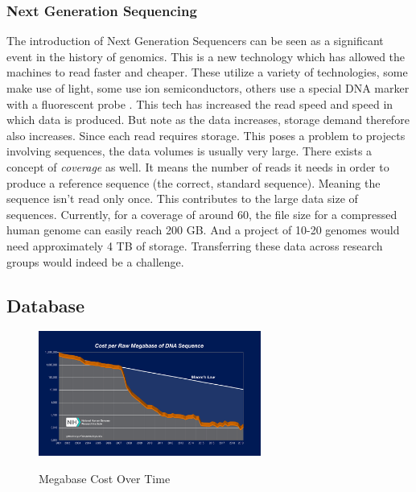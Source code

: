 \documentclass{article}
\begin{document}
\subsubsection{Next Generation Sequencing}


The introduction of Next Generation Sequencers can be seen as a significant event in the history of genomics. This is a new technology which has allowed the machines to read faster and cheaper. These utilize a variety of technologies, some make use of light, some use ion semiconductors, others use a special DNA marker with a fluorescent probe \autocite[~p.67]{paulselzer2018}. This tech has increased the read speed and speed in which data is produced. But note as the data increases, storage demand therefore also increases. Since each read requires storage. This poses a problem to projects involving sequences, the data volumes is usually very large\autocite{bon_compression}. There exists a concept of \textit{coverage} as well. It means the number of reads it needs in order to produce a reference sequence (the correct, standard sequence). Meaning the sequence isn't read only once. This contributes to the large data size of sequences. Currently, for a coverage of around 60, the file size for a compressed human genome can easily reach 200 GB. And a project of 10-20 genomes would need approximately 4 TB of storage. Transferring these data across research groups would indeed be a challenge. \autocite[~p.68]{paulselzer2018}



\subsection{Database}

\begin{figure}[h]
\caption{Megabase Cost Over Time}
\centering
\includegraphics[width=0.65\textwidth]{images/seq-cost.jpeg} 
\label{fig:megabase_cost_fig}
\end{figure}
\end{document}
